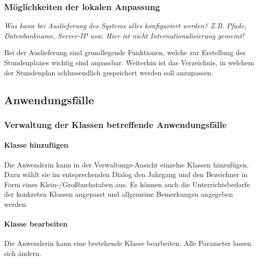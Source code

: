 \documentclass[fontsize=12pt,paper=a4,twoside]{scrartcl}
\begin{document}
\subsubsection{Möglichkeiten der lokalen Anpassung}


  {\em Was kann bei Auslieferung des Systems alles konfiguriert
  werden? Z.B. Pfade, Datenbankname, Server-IP usw. Hier ist nicht
  Internationalisierung gemeint!}

Bei der Auslieferung sind grundlegende Funktionen, welche zur Erstellung des Stundenplanes wichtig sind anpassbar.
Weiterhin ist das Verzeichnis, in welchem der Stundenplan schlussendlich gespeichert werden soll anzupassen.


\subsection{Anwendungsfälle}
  
\subsubsection{Verwaltung der Klassen betreffende Anwendungsfälle}


\paragraph{Klasse hinzufügen} Die Anwenderin kann in der Verwaltungs-Ansicht einzelne Klassen hinzufügen. Dazu wählt sie im entsprechenden Dialog den Jahrgang und den Bezeichner in Form eines Klein-/Großbuchstaben aus. Es können auch die Unterrichtsbedarfe der konkreten Klassen angepasst und allgemeine Bemerkungen angegeben werden.

\paragraph{Klasse bearbeiten} Die Anwenderin kann eine bestehende Klasse bearbeiten. Alle Parameter lassen sich ändern.
\end{document}

